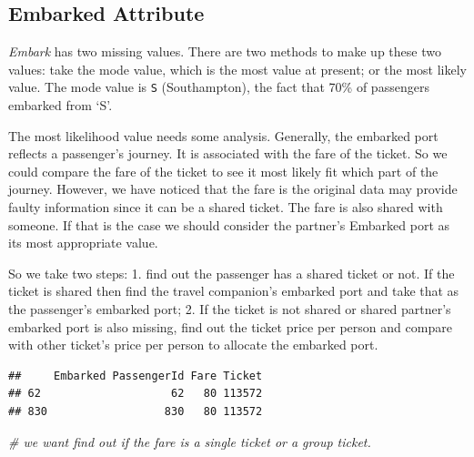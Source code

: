 \documentclass[
]{book}
\newenvironment{Shaded}{\begin{snugshade}}{\end{snugshade}}
\newcommand{\CommentTok}[1]{\textcolor[rgb]{0.56,0.35,0.01}{\textit{#1}}}
\newcommand{\KeywordTok}[1]{\textcolor[rgb]{0.13,0.29,0.53}{\textbf{#1}}}
\newcommand{\NormalTok}[1]{#1}
\newcommand{\OperatorTok}[1]{\textcolor[rgb]{0.81,0.36,0.00}{\textbf{#1}}}
\newcommand{\StringTok}[1]{\textcolor[rgb]{0.31,0.60,0.02}{#1}}
\begin{document}
\hypertarget{Embarked}{%
\subsection*{Embarked Attribute}\label{Embarked}}


\emph{Embark} has two missing values. There are two methods to make up these two values: take the mode value, which is the most value at present; or the most likely value. The mode value is \texttt{S} (Southampton), the fact that 70\% of passengers embarked from `S'.

The most likelihood value needs some analysis. Generally, the embarked port reflects a passenger's journey. It is associated with the fare of the ticket. So we could compare the fare of the ticket to see it most likely fit which part of the journey. However, we have noticed that the fare is the original data may provide faulty information since it can be a shared ticket. The fare is also shared with someone. If that is the case we should consider the partner's Embarked port as its most appropriate value.

So we take two steps:
1. find out the passenger has a shared ticket or not. If the ticket is shared then find the travel companion's embarked port and take that as the passenger's embarked port;
2. If the ticket is not shared or shared partner's embarked port is also missing, find out the ticket price per person and compare with other ticket's price per person to allocate the embarked port.

\begin{Shaded}
\end{Shaded}

\begin{verbatim}
##     Embarked PassengerId Fare Ticket
## 62                    62   80 113572
## 830                  830   80 113572
\end{verbatim}

\begin{Shaded}
\begin{Highlighting}[]
\CommentTok{# we want find out if the fare is a single ticket or a group ticket.}
\end{Highlighting}
\end{Shaded}
\end{document}
